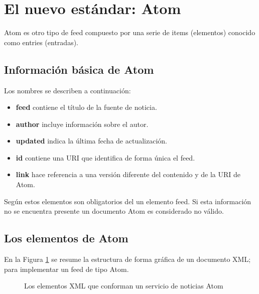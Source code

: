 \section{El nuevo estándar: Atom}

Atom es otro tipo de feed compuesto por una serie de items (elementos)
conocido como entries (entradas).

\subsection{Información básica de Atom}

Los nombres se describen a continuación:

\begin{itemize}

\item \textbf{feed} contiene el título de la fuente de noticia.
\item \textbf{author} incluye información sobre el autor.
\item \textbf{updated} indica la última fecha de actualización.
\item \textbf{id} contiene una URI que identifica de forma única el feed.
\item \textbf{link} hace referencia a una versión diferente del contenido y de la
URI de Atom.

\end{itemize}

Según \cite{wittenbrink2005rss} estos elementos son obligatorios del un
elemento feed. Si esta información no se encuentra presente un documento
Atom es considerado no válido.

\subsection{Los elementos de Atom}

En la Figura \ref{Los elementos XML que conforman un servicio de noticias Atom}
se resume la estructura de forma gráfica de un documento XML; para implementar
un feed de tipo Atom.

\begin{figure}[!ht]
	\centering
	\caption{Los elementos XML que conforman un servicio de noticias Atom}
	\label{Los elementos XML que conforman un servicio de noticias Atom}
\end{figure}